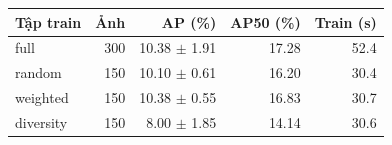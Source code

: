 \begin{tabular}{lrrrr}
\toprule
Tập train & Ảnh & AP (\%) & AP50 (\%) & Train (s) \\
\midrule
full & 300 & 10.38 $\pm$ 1.91 & 17.28 & 52.4 \\
random & 150 & 10.10 $\pm$ 0.61 & 16.20 & 30.4 \\
weighted & 150 & 10.38 $\pm$ 0.55 & 16.83 & 30.7 \\
diversity & 150 & 8.00 $\pm$ 1.85 & 14.14 & 30.6 \\
\bottomrule
\end{tabular}
